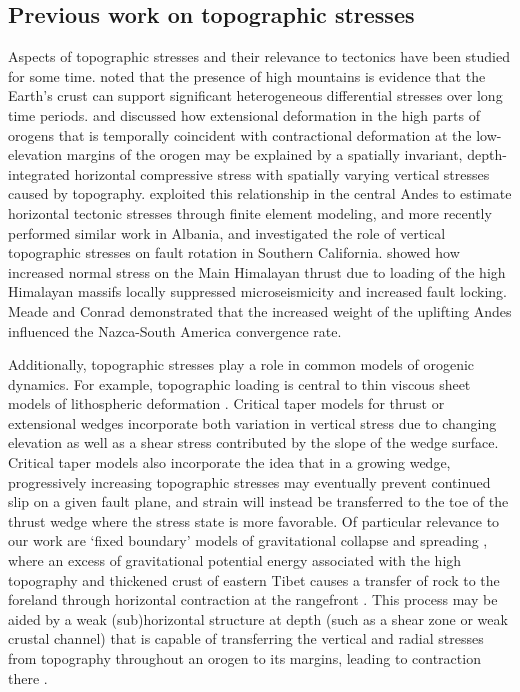 \documentclass[twocolumn,jgrga]{AGUTeX}
\begin{document}
\begin{article}
\subsection{Previous work on topographic
stresses}\label{previous-work-on-topographic-stresses}

Aspects of topographic stresses and their relevance to tectonics have been
studied for some time. \citet{jeffreys1924} noted that the presence of high
mountains is evidence that the Earth's crust can support significant
heterogeneous differential stresses over long time periods.
\citet{dalmayrac1981} and \citet{molnar1988} discussed how extensional
deformation in the high parts of orogens that is temporally coincident with
contractional deformation at the low-elevation margins of the orogen may be
explained by a spatially invariant, depth-integrated horizontal compressive
stress with spatially varying vertical stresses caused by topography.
\citet{richardson1994} exploited this relationship in the central Andes to
estimate horizontal tectonic stresses through finite element modeling, and more
recently \citet{copley2009} performed similar work in Albania, and
\citet{fialko2005} investigated the role of vertical topographic stresses on
fault rotation in Southern California.
\citet{bollinger2004} showed how increased normal stress on the Main Himalayan
thrust due to loading of the high Himalayan massifs locally suppressed
microseismicity and increased fault locking. Meade and Conrad \citet{meade2008}
demonstrated that the increased weight of the uplifting Andes influenced the
Nazca-South America convergence rate.

Additionally, topographic stresses play a role in common models of orogenic
dynamics. For example, topographic loading is central to thin viscous sheet
models of lithospheric deformation \citep[e.g.,][]{birdpiper80, flesch2010gpe}.
Critical taper models for thrust or extensional wedges
\citep[e.g.,][]{dahlen1990, xiao1991} incorporate both variation in vertical
stress due to changing elevation as well as a shear stress contributed by the
slope of the wedge surface. Critical taper models also incorporate the idea
that in a growing wedge, progressively increasing topographic stresses may
eventually prevent continued slip on a given fault plane, and strain will
instead be transferred to the toe of the thrust wedge where the stress state is
more favorable. Of particular relevance to our work are `fixed boundary' models
of gravitational collapse and spreading \citep{rey2001}, where an excess of
gravitational potential energy associated with the high topography and
thickened crust of eastern Tibet causes a transfer of rock to the foreland
through horizontal contraction at the rangefront \citep[e.g.,][] {dewey1988,
liuyang2003, copleymckenzie2007}. This process may be aided by a weak
(sub)horizontal structure at depth (such as a shear zone or weak crustal
channel) that is capable of transferring the vertical and radial stresses from
topography throughout an orogen to its margins, leading to contraction there
\citep[e.g.,][]{clark2005, burchfiel2008, fleschbendick2012}.


\end{article}
\end{document}
